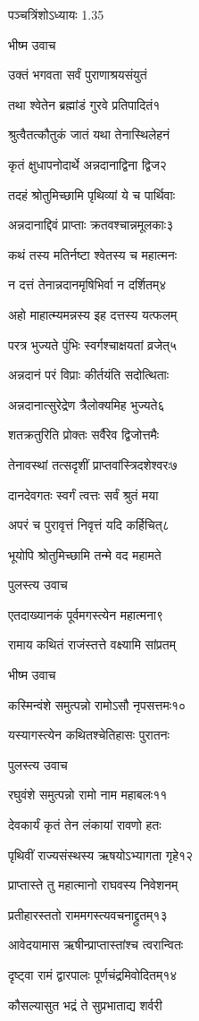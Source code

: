 
पञ्चत्रिंशोऽध्यायः 1.35

भीष्म उवाच

उक्तं भगवता सर्वं पुराणाश्रयसंयुतं

तथा श्वेतेन ब्रह्मांडं गुरवे प्रतिपादितं१

श्रुत्वैतत्कौतुकं जातं यथा तेनास्थिलेहनं

कृतं क्षुधापनोदार्थे अन्नदानाद्विना द्विज२

तदहं श्रोतुमिच्छामि पृथिव्यां ये च पार्थिवाः

अन्नदानाद्दिवं प्राप्ताः क्रतवश्चान्नमूलकाः३

कथं तस्य मतिर्नष्टा श्वेतस्य च महात्मनः

न दत्तं तेनान्नदानमृषिभिर्वा न दर्शितम्४

अहो माहात्म्यमन्नस्य इह दत्तस्य यत्फलम्

परत्र भुज्यते पुंभिः स्वर्गश्चाक्षयतां व्रजेत्५

अन्नदानं परं विप्राः कीर्तयंति सदोत्थिताः

अन्नदानात्सुरेद्रेण त्रैलोक्यमिह भुज्यते६

शतक्रतुरिति प्रोक्तः सर्वैरेव द्विजोत्तमैः

तेनावस्थां तत्सदृशीं प्राप्तवांस्त्रिदशेश्वरः७

दानदेवगतः स्वर्गं त्वत्तः सर्वं श्रुतं मया

अपरं च पुरावृत्तं निवृत्तं यदि कर्हिचित्८

भूयोपि श्रोतुमिच्छामि तन्मे वद महामते

पुलस्त्य उवाच

एतदाख्यानकं पूर्वमगस्त्येन महात्मना९

रामाय कथितं राजंस्तत्ते वक्ष्यामि सांप्रतम्

भीष्म उवाच

कस्मिन्वंशे समुत्पन्नो रामोऽसौ नृपसत्तमः१०

यस्यागस्त्येन कथितश्चेतिहासः पुरातनः

पुलस्त्य उवाच

रघुवंशे समुत्पन्नो रामो नाम महाबलः११

देवकार्यं कृतं तेन लंकायां रावणो हतः

पृथिवीं राज्यसंस्थस्य ऋषयोऽभ्यागता गृहे१२

प्राप्तास्ते तु महात्मानो राघवस्य निवेशनम्

प्रतीहारस्ततो राममगस्त्यवचनाद्द्रुतम्१३

आवेदयामास ऋषीन्प्राप्तास्तांश्च त्वरान्वितः

दृष्ट्वा रामं द्वारपालः पूर्णचंद्रमिवोदितम्१४

कौसल्यासुत भद्रं ते सुप्रभाताद्य शर्वरी

